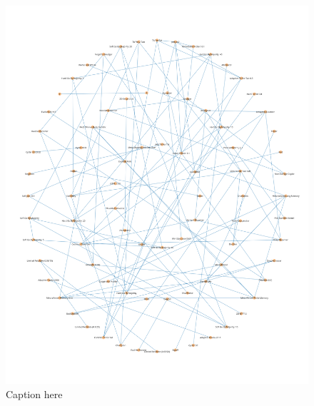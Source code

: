 \begin{figure}[htbp!]
    \centering
    \includegraphics[width=\linewidth]{../img/neighbourhoods/overall.png}
    \caption{Caption here}
    \label{fig:figure1}
\end{figure}

